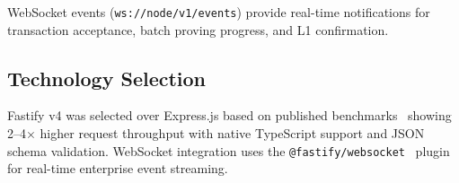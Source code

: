 WebSocket events (\texttt{ws://node/v1/events}) provide real-time
notifications for transaction acceptance, batch proving progress, and
L1 confirmation.

\subsection{Technology Selection}

Fastify v4 was selected over Express.js based on published
benchmarks~\cite{fastify2025comparison} showing 2--4$\times$ higher
request throughput with native TypeScript support and JSON schema
validation. WebSocket integration uses the
\texttt{@fastify/websocket}~\cite{fastify2025websocket} plugin for
real-time enterprise event streaming.

